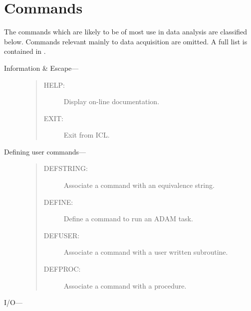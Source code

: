 \section{Commands}

The commands which are likely to be of most use in data analysis are classified
below.
Commands relevant mainly to data acquisition are omitted.
A full list is contained in .
\begin{description}

\item [Information \& Escape--- ]

\begin{quote}
\begin{description}
\item[HELP:]
 Display on-line documentation.
\item[EXIT:]
 Exit from ICL.
\end{description}
\end{quote}

\item [Defining user commands--- ]

\begin{quote}
\begin{description}
\item[DEFSTRING:]
 Associate a command with an equivalence string.
\item[DEFINE:]
 Define a command to run an ADAM task.
\item[DEFUSER:]
 Associate a command with a user written subroutine.
\item[DEFPROC:]
 Associate a command with a procedure.
\end{description}
\end{quote}

\item [I/O--- ]


\end{description}
